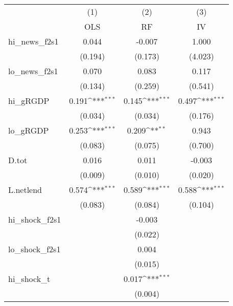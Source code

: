 {
\def\sym#1{\ifmmode^{#1}\else\(^{#1}\)\fi}
\begin{tabular}{l*{3}{c}}
\toprule
            &\multicolumn{1}{c}{(1)}&\multicolumn{1}{c}{(2)}&\multicolumn{1}{c}{(3)}\\
            &\multicolumn{1}{c}{OLS}&\multicolumn{1}{c}{RF}&\multicolumn{1}{c}{IV}\\
\midrule
hi\_news\_f2s1&       0.044         &      -0.007         &       1.000         \\
            &     (0.194)         &     (0.173)         &     (4.023)         \\
\addlinespace
lo\_news\_f2s1&       0.070         &       0.083         &       0.117         \\
            &     (0.134)         &     (0.259)         &     (0.541)         \\
\addlinespace
hi\_gRGDP    &       0.191\sym{***}&       0.145\sym{***}&       0.497\sym{***}\\
            &     (0.034)         &     (0.034)         &     (0.176)         \\
\addlinespace
lo\_gRGDP    &       0.253\sym{***}&       0.209\sym{**} &       0.943         \\
            &     (0.083)         &     (0.075)         &     (0.700)         \\
\addlinespace
D.tot       &       0.016         &       0.011         &      -0.003         \\
            &     (0.009)         &     (0.010)         &     (0.020)         \\
\addlinespace
L.netlend   &       0.574\sym{***}&       0.589\sym{***}&       0.588\sym{***}\\
            &     (0.083)         &     (0.084)         &     (0.104)         \\
\addlinespace
hi\_shock\_f2s1&                     &      -0.003         &                     \\
            &                     &     (0.022)         &                     \\
\addlinespace
lo\_shock\_f2s1&                     &       0.004         &                     \\
            &                     &     (0.015)         &                     \\
\addlinespace
hi\_shock\_t  &                     &       0.017\sym{***}&                     \\
            &                     &     (0.004)         &                     \\

\end{tabular}}
